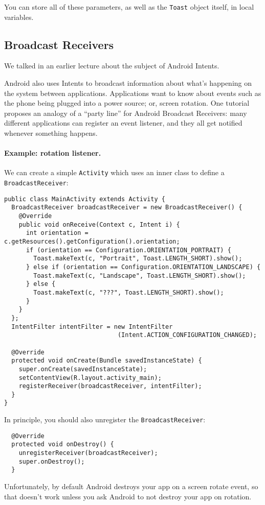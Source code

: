 You can store all of these parameters, as well as the {\tt Toast} object itself,
in local variables.

\subsection*{Broadcast Receivers}
We talked in an earlier lecture about the subject of Android Intents.

Android also uses Intents to broadcast information about what's
happening on the system between applications. Applications want to
know about events such as the phone being plugged into a power source;
or, screen rotation.  One
tutorial~\cite{broadcastreceiver}  proposes an analogy of a ``party line''
for Android Broadcast Receivers: many different applications can
register an event listener, and they all get notified whenever
something happens.

\paragraph{Example: rotation listener.} We can create a simple {\tt Activity} which uses an inner
class to define a {\tt BroadcastReceiver}:

{\small
\begin{lstlisting}
public class MainActivity extends Activity {
  BroadcastReceiver broadcastReceiver = new BroadcastReceiver() {
    @Override
    public void onReceive(Context c, Intent i) {
      int orientation = c.getResources().getConfiguration().orientation;
      if (orientation == Configuration.ORIENTATION_PORTRAIT) {
        Toast.makeText(c, "Portrait", Toast.LENGTH_SHORT).show();
      } else if (orientation == Configuration.ORIENTATION_LANDSCAPE) {
        Toast.makeText(c, "Landscape", Toast.LENGTH_SHORT).show();
      } else {
        Toast.makeText(c, "???", Toast.LENGTH_SHORT).show();
      }
    }
  };
  IntentFilter intentFilter = new IntentFilter
                               (Intent.ACTION_CONFIGURATION_CHANGED);

  @Override
  protected void onCreate(Bundle savedInstanceState) {
    super.onCreate(savedInstanceState);
    setContentView(R.layout.activity_main);
    registerReceiver(broadcastReceiver, intentFilter);
  }
}
\end{lstlisting}
}
In principle, you should also unregister the {\tt BroadcastReceiver}:
\begin{lstlisting}
  @Override
  protected void onDestroy() {
    unregisterReceiver(broadcastReceiver);
    super.onDestroy();
  }
\end{lstlisting}
Unfortunately, by default Android destroys your app on a screen rotate event, so 
that doesn't work unless you ask Android to not destroy your app on rotation. 

